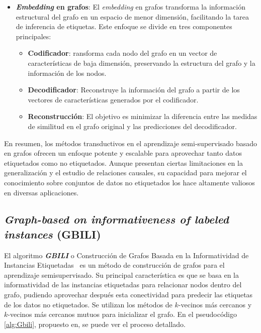 \begin{itemize}
	\item \textbf{\textit{Embedding} en grafos}: El \textit{embedding} en grafos transforma la información estructural del grafo en un espacio de menor dimensión, facilitando la tarea de inferencia de etiquetas. Este enfoque se divide en tres componentes principales:
	\begin{itemize}
		\item \textbf{Codificador}: ransforma cada nodo del grafo en un vector de características de baja dimensión, preservando la estructura del grafo y la información de los nodos.
		\item \textbf{Decodificador}: Reconstruye la información del grafo a partir de los vectores de características generados por el codificador.
		\item \textbf{Reconstrucción}: El objetivo es minimizar la diferencia entre las medidas de similitud en el grafo original y las predicciones del decodificador.
	\end{itemize}
\end{itemize}

En resumen, los métodos transductivos en el aprendizaje semi-supervisado basado en grafos ofrecen un enfoque potente y escalable para aprovechar tanto datos etiquetados como no etiquetados. Aunque presentan ciertas limitaciones en la generalización y el estudio de relaciones causales, su capacidad para mejorar el conocimiento sobre conjuntos de datos no etiquetados los hace altamente valiosos en diversas aplicaciones.
\clearpage
\subsection{\textit{ Graph-based on informativeness of
labeled instances} (GBILI)}\label{sec3:gbili}
El algoritmo \textit{\textbf{GBILI}} o Construcción de Grafos Basada en la Informatividad de Instancias Etiquetadas~\cite{gbili} es un método de construcción de grafos para el aprendizaje semisupervisado. Su principal característica es que se basa en la informatividad de las instancias etiquetadas para relacionar nodos dentro del grafo, pudiendo aprovechar después esta conectividad para predecir las etiquetas de los datos no etiquetados. Se utilizan los métodos de $k$-vecinos más cercanos y  $k$-vecinos más cercanos mutuos para inicializar el grafo. En el pseudocódigo \ref{alg:Gbili}, propuesto en, se puede ver el proceso detallado.

